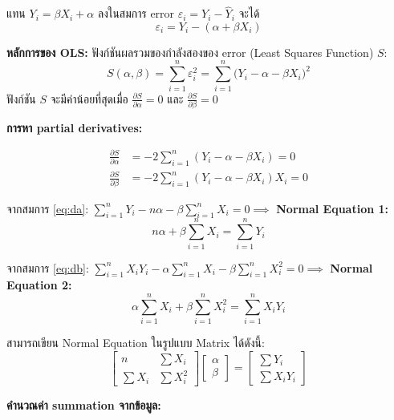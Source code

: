 \documentclass[12pt,a4paper]{article}
\begin{document}
แทน $Y_i = \beta X_i + \alpha$ ลงในสมการ error $\varepsilon_i = Y_i - \hat{Y}_i$ จะได้
\[
    \varepsilon_i = Y_i - (\alpha + \beta X_i)
\]

\medskip\noindent
\textbf{หลักการของ OLS:}
ฟังก์ชันผลรวมของกำลังสองของ error (Least Squares Function) $S$:
\[
    S(\alpha, \beta) = \sum_{i=1}^{n} \varepsilon_i^2 = \sum_{i=1}^{n} \bigl(Y_i - \alpha - \beta X_i\bigr)^2
\]
ฟังก์ชัน $S$ จะมีค่าน้อยที่สุดเมื่อ $\frac{\partial S}{\partial \alpha} = 0$ และ $\frac{\partial S}{\partial \beta} = 0$

\medskip\noindent
\textbf{การหา partial derivatives:}

\begin{align}
    \frac{\partial S}{\partial \alpha} &= -2\sum_{i=1}^{n}(Y_i - \alpha - \beta X_i) = 0 \label{eq:da}\\[6pt]
    \frac{\partial S}{\partial \beta}  &= -2\sum_{i=1}^{n}(Y_i - \alpha - \beta X_i)X_i = 0 \label{eq:db}
\end{align}

จากสมการ \eqref{eq:da}: 
$\displaystyle\sum_{i=1}^{n} Y_i - n\alpha - \beta\sum_{i=1}^{n} X_i = 0 \implies$ \textbf{Normal Equation 1:}
\[
    n\alpha + \beta\sum_{i=1}^{n} X_i = \sum_{i=1}^{n} Y_i
\]

จากสมการ \eqref{eq:db}: 
$\displaystyle\sum_{i=1}^{n} X_i Y_i - \alpha\sum_{i=1}^{n} X_i - \beta\sum_{i=1}^{n} X_i^2 = 0 \implies$ \textbf{Normal Equation 2:}
\[
    \alpha\sum_{i=1}^{n} X_i + \beta\sum_{i=1}^{n} X_i^2 = \sum_{i=1}^{n} X_i Y_i
\]

สามารถเขียน Normal Equation ในรูปแบบ Matrix ได้ดังนี้:
\[
    \begin{bmatrix}
        n & \sum X_i \\
        \sum X_i & \sum X_i^2
    \end{bmatrix}
    \begin{bmatrix}
        \alpha \\
        \beta
    \end{bmatrix}
    =
    \begin{bmatrix}
        \sum Y_i \\
        \sum X_i Y_i
    \end{bmatrix}
\]

\medskip\noindent
\textbf{คำนวณค่า summation จากข้อมูล:}
\end{document}

